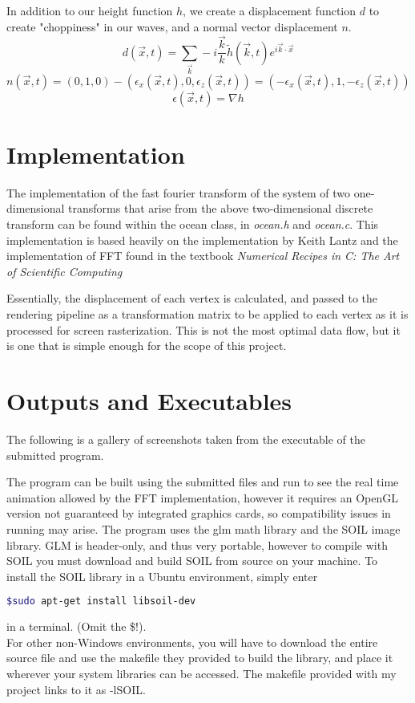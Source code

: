 \documentclass[11pt]{article} %
\begin{document}
\par In addition to our height function $h$, we create a displacement function $d$ to create "choppiness" in our waves, and a normal vector displacement $n$.
	$$d(\vec{x},t) = \sum_{\vec{k}} - i \frac{\vec{k}}{k}\tilde{h}(\vec{k},t)e^{i\vec{k} \cdot \vec{x}}$$
	$$n(\vec{x},t) = (0,1,0) - (\epsilon_x(\vec{x},t),0,\epsilon_z(\vec{x},t)) = (-\epsilon_x(\vec{x},t),1,-\epsilon_z(\vec{x},t))$$
	$$\epsilon(\vec{x},t) = \nabla h$$
\section*{Implementation}
The implementation of the fast fourier transform of the system of two one-dimensional transforms that arise from the above two-dimensional discrete transform can be found within the ocean class, in \textit{ocean.h} and \textit{ocean.c}. This implementation is based heavily on the implementation by Keith Lantz and the implementation of FFT found in the textbook \textit{Numerical Recipes in C: The Art of Scientific Computing}
\par Essentially, the displacement of each vertex is calculated, and passed to the rendering pipeline as a transformation matrix to be applied to each
vertex as it is processed for screen rasterization. This is not the most optimal data flow, but it is one that is simple enough for the scope of this project.
\section*{Outputs and Executables}

The following is a gallery of screenshots taken from the executable of the submitted program.


\par The program can be built using the submitted files and run to see the real time animation allowed by the FFT implementation, however
it requires an OpenGL version not guaranteed by integrated graphics cards, so compatibility issues in running may arise. The program uses the 
glm math library and the SOIL image library. GLM is header-only, and thus very portable, however to compile with SOIL you must download and
build SOIL from source on your machine.
To install the SOIL library in a Ubuntu environment, simply enter
\begin{lstlisting}[language = bash]
$sudo apt-get install libsoil-dev
\end{lstlisting}
in a terminal. (Omit the \$!).\\
For other non-Windows environments, you will have to download the entire source file and
use the makefile they provided to build the library, and place it wherever your system libraries
can be accessed. The makefile provided with my project links to it as -lSOIL.
\end{document}
